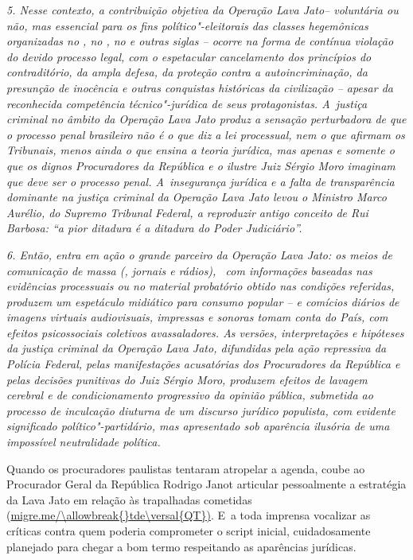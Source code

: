 \emph{5. Nesse contexto, a contribuição objetiva da Operação Lava Jato--
voluntária ou não, mas essencial para os fins político"-eleitorais das
classes hegemônicas organizadas no , no , no  e outras siglas
-- ocorre na forma de contínua violação do devido processo legal, com o
espetacular cancelamento dos princípios do contraditório, da ampla
defesa, da proteção contra a autoincriminação, da presunção de inocência
e outras conquistas históricas da civilização -- apesar da reconhecida
competência técnico"-jurídica de seus protagonistas. A~justiça criminal
no âmbito da Operação Lava Jato produz a sensação perturbadora de que o
processo penal brasileiro não é o que diz a lei processual, nem o que
afirmam os Tribunais, menos ainda o que ensina a teoria jurídica, mas
apenas e somente o que os dignos Procuradores da República e o ilustre
Juiz Sérgio Moro imaginam que deve ser o processo penal. A~insegurança
jurídica e a falta de transparência dominante na justiça criminal da
Operação Lava Jato levou o Ministro Marco Aurélio, do Supremo Tribunal
Federal, a reproduzir antigo conceito de Rui Barbosa: ``a pior ditadura
é a ditadura do Poder Judiciário''.}

\emph{6. Então, entra em ação o grande parceiro da Operação Lava Jato:
os meios de comunicação de massa (, jornais e rádios),~ com
informações baseadas nas evidências processuais ou no material
probatório obtido nas condições referidas, produzem um espetáculo
midiático para consumo popular -- e comícios diários de imagens virtuais
audiovisuais, impressas e sonoras tomam conta do País, com efeitos
psicossociais coletivos avassaladores. As versões, interpretações e
hipóteses da justiça criminal da Operação Lava Jato, difundidas pela
ação repressiva da Polícia Federal, pelas manifestações acusatórias dos
Procuradores da República e pelas decisões punitivas do Juiz Sérgio
Moro, produzem efeitos de lavagem cerebral e de condicionamento
progressivo da opinião pública, submetida ao processo de inculcação
diuturna de um discurso jurídico populista, com evidente significado
político"-partidário, mas apresentado sob aparência ilusória de uma
impossível neutralidade política.}

Quando os procuradores paulistas tentaram atropelar a agenda, coube ao
Procurador Geral da República Rodrigo Janot articular pessoalmente a
estratégia da Lava Jato em relação às trapalhadas cometidas
(\url{migre.me/\allowbreak{}tde\versal{QT})}. E~a toda imprensa vocalizar as críticas
contra quem poderia comprometer o script inicial, cuidadosamente
planejado para chegar a bom termo respeitando as aparências jurídicas.

